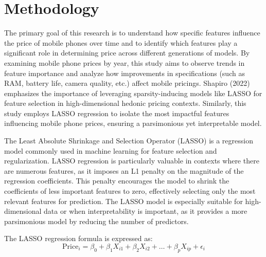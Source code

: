 \documentclass[12pt]{article}
\begin{document}

\section{Methodology}

The primary goal of this research is to understand how specific features influence the price of mobile phones over time and to identify which features play a significant role in determining price across different generations of models. By examining mobile phone prices by year, this study aims to observe trends in feature importance and analyze how improvements in specifications (such as RAM, battery life, camera quality, etc.) affect mobile pricings. Shapiro (2022) emphasizes the importance of leveraging sparsity-inducing models like LASSO for feature selection in high-dimensional hedonic pricing contexts. Similarly, this study employs LASSO regression to isolate the most impactful features influencing mobile phone prices, ensuring a parsimonious yet interpretable model.

The Least Absolute Shrinkage and Selection Operator (LASSO) is a regression model commonly used in machine learning for feature selection and regularization. LASSO regression is particularly valuable in contexts where there are numerous features, as it imposes an L1 penalty on the magnitude of the regression coefficients. This penalty encourages the model to shrink the coefficients of less important features to zero, effectively selecting only the most relevant features for prediction. The LASSO model is especially suitable for high-dimensional data or when interpretability is important, as it provides a more parsimonious model by reducing the number of predictors.

The LASSO regression formula is expressed as:
\begin{equation}
\text{Price}_i = \beta_0 + \beta_1 X_{i1} + \beta_2 X_{i2} + \dots + \beta_p X_{ip} + \epsilon_i
\end{equation}
\end{document}
